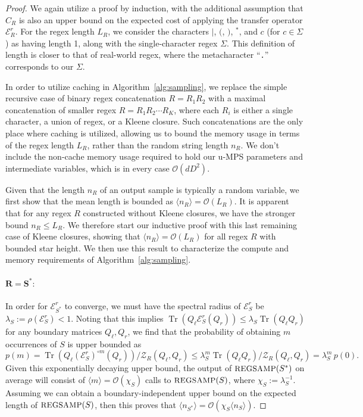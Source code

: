 \documentclass[twoside]{article}
\newcommand{\Sample}{\textsc{\small REGSAMP}}
\DeclareMathOperator{\Tr}{Tr}
\newcommand{\bigO}{\mc{O}}
\newcommand{\ER}{\mc{E}^{\scriptstyle r}}
\newcommand{\QL}{Q_{\ell}}
\newcommand{\QR}{Q_{r}}
\newcommand{\mc}[1]{\mathcal{#1}}
\begin{document}
\begin{proof}

We again utilize a proof by induction, with the additional assumption that $C_R$ is also an upper bound on the expected cost of applying the transfer operator $\ER_R$. For the regex length $L_R$, we consider the characters $|$, $($, $)$, $^*$, and $c$ (for $c \in \Sigma$) as having length 1, along with the single-character regex $\Sigma$. This definition of length is closer to that of real-world regex, where the metacharacter ``\texttt{.}'' corresponds to our $\Sigma$.

In order to utilize caching in Algorithm~\ref{alg:sampling}, 
we replace the simple recursive case of binary regex concatenation $R = R_1 R_2$ with a maximal concatenation of smaller regex $R = R_1 R_2 \cdots R_K$, where each $R_i$ is either a single character, a union of regex, or a Kleene closure. Such concatenations are the only place where caching is utilized, allowing us to bound the memory usage in terms of the regex length $L_R$, rather than the random string length $n_R$. We don't include the non-cache memory usage required to hold our u-MPS parameters and intermediate variables, which is in every case $\bigO(d D^2)$.

Given that the length $n_R$ of an output sample is typically a random variable, we first show that the mean length is bounded as $\langle n_R \rangle = \bigO(L_R)$. It is apparent that for any regex $R$ constructed without Kleene closures, we have the stronger bound $n_R \leq L_R$. We therefore start our inductive proof with this last remaining case of Kleene closures, showing that $\langle n_R \rangle = \bigO(L_R)$ for all regex $R$ with bounded star height. We then use this result to characterize the compute and memory requirements of Algorithm~\ref{alg:sampling}.

\paragraph{$\mathbf{R = S^*:}$} In order for $\ER_{S^*}$ to converge, we must have the spectral radius of $\ER_S$ be $\lambda_S := \rho(\ER_S) < 1$. Noting that this implies $\Tr(\QL \ER_S(\QR)) \leq \lambda_S \Tr(\QL \QR)$ for any boundary matrices $\QL, \QR$, we find that the probability of obtaining $m$ occurrences of $S$ is upper bounded as
%
\begin{equation*}
p(m) = \Tr(\QL (\ER_S)^{\circ m}(\QR)) / \mc{Z}_R(\QL, \QR) \leq \lambda_S^m \Tr(\QL \QR) / \mc{Z}_R(\QL, \QR) = \lambda_S^m\, p(0).
\end{equation*}
%
Given this exponentially decaying upper bound, the output of $\Sample(S^*)$ on average will consist of $\langle m \rangle = \bigO(\chi_S)$ calls to $\Sample(S)$, where $\chi_S := \lambda_S^{-1}$. Assuming we can obtain a boundary-independent upper bound on the expected length of $\Sample(S)$, then this proves that $\langle n_{S^*} \rangle = \bigO(\chi_S \langle n_S \rangle)$.


\end{proof}
\end{document}
